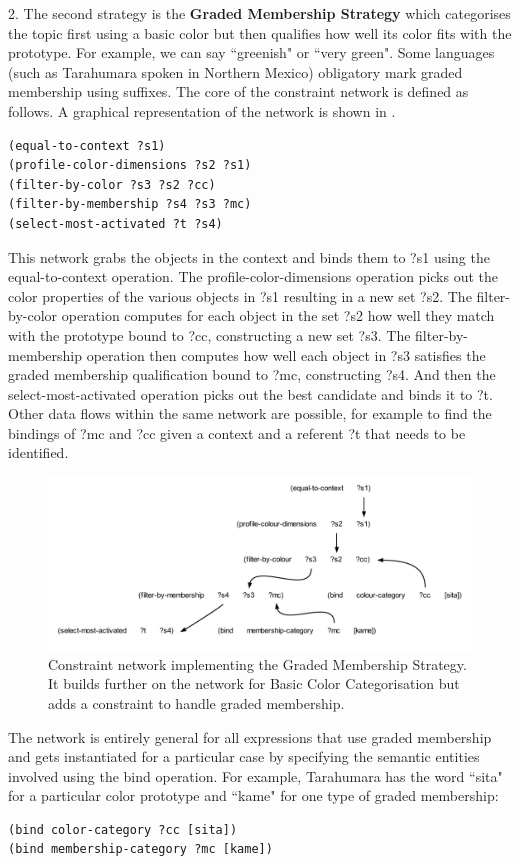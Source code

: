 2. The second strategy is the {\bf Graded Membership Strategy} which categorises the topic first using 
a basic color but then qualifies how well its color fits with the prototype. For example, we can say ``greenish" or
``very green". Some languages (such as Tarahumara spoken in Northern Mexico) obligatory mark graded membership using 
suffixes. The core of the constraint network is defined as follows. A graphical representation of the network is shown
in . 
\begin{verbatim}
(equal-to-context ?s1) 
(profile-color-dimensions ?s2 ?s1)
(filter-by-color ?s3 ?s2 ?cc)
(filter-by-membership ?s4 ?s3 ?mc)
(select-most-activated ?t ?s4)
\end{verbatim}
This network grabs the objects in the context and binds them to ?s1 using the equal-to-context operation. 
The profile-color-dimensions operation picks out the color properties of the various objects in ?s1 resulting in 
a new set ?s2. The filter-by-color operation computes for each object in the set ?s2
how well they match with the prototype bound to ?cc, constructing a new set ?s3. The filter-by-membership operation 
then computes how well 
each object in ?s3 satisfies the graded membership qualification bound to ?mc, 
constructing ?s4. And then the select-most-activated operation picks out the best candidate and binds it to ?t. 
Other data flows within the same network are possible, for example to find the bindings of ?mc and ?cc given 
a context and a referent ?t that needs to be identified. 

\begin{figure}[htbp]
  \centerline{\includegraphics[width=1.0\textwidth]{chap11/figs/graded}}
\caption{\footnotesize\label{fig:graded} 
Constraint network implementing the Graded Membership Strategy. It builds further on the network for Basic Color
Categorisation but adds a constraint to handle graded membership. }
\end{figure}

The network is entirely general for all expressions that use graded membership and gets instantiated for a particular 
case by specifying the semantic entities involved using the bind operation. For example, Tarahumara has the word 
``sita" for a particular color prototype and ``kame" for one type of graded membership: 
\begin{verbatim}
(bind color-category ?cc [sita])
(bind membership-category ?mc [kame]) 
\end{verbatim}

